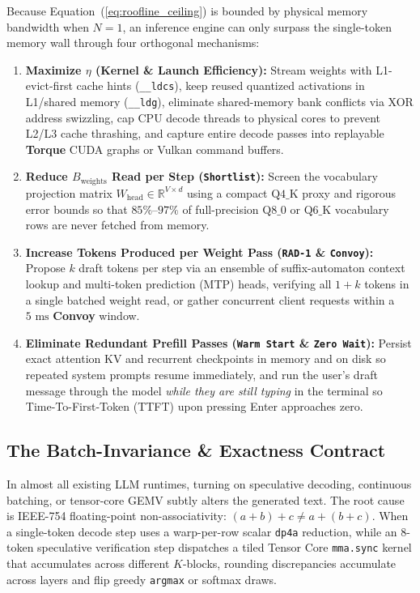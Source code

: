 \documentclass[10pt,a4paper]{article}
\theoremstyle{swzstyle}
\newcommand{\code}[1]{\texttt{#1}}
\begin{document}
Because Equation~(\ref{eq:roofline_ceiling}) is bounded by physical memory bandwidth when $N=1$, an inference engine can only surpass the single-token memory wall through four orthogonal mechanisms:
\begin{enumerate}
  \item \textbf{Maximize $\eta$ (Kernel \& Launch Efficiency):} Stream weights with L1-evict-first cache hints (\code{\_\_ldcs}), keep reused quantized activations in L1/shared memory (\code{\_\_ldg}), eliminate shared-memory bank conflicts via XOR address swizzling, cap CPU decode threads to physical cores to prevent L2/L3 cache thrashing, and capture entire decode passes into replayable \textbf{Torque} CUDA graphs or Vulkan command buffers.
  \item \textbf{Reduce $B_{\text{weights}}$ Read per Step (\texttt{Shortlist}):} Screen the vocabulary projection matrix $W_{\text{head}} \in \mathbb{R}^{V \times d}$ using a compact $\text{Q4\_K}$ proxy and rigorous error bounds so that $85\%\text{--}97\%$ of full-precision $\text{Q8\_0}$ or $\text{Q6\_K}$ vocabulary rows are never fetched from memory.
  \item \textbf{Increase Tokens Produced per Weight Pass (\texttt{RAD-1} \& \texttt{Convoy}):} Propose $k$ draft tokens per step via an ensemble of suffix-automaton context lookup and multi-token prediction (MTP) heads, verifying all $1+k$ tokens in a single batched weight read, or gather concurrent client requests within a $5\text{ ms}$ \textbf{Convoy} window.
  \item \textbf{Eliminate Redundant Prefill Passes (\texttt{Warm Start} \& \texttt{Zero Wait}):} Persist exact attention KV and recurrent checkpoints in memory and on disk so repeated system prompts resume immediately, and run the user's draft message through the model \emph{while they are still typing} in the terminal so Time-To-First-Token (TTFT) upon pressing Enter approaches zero.
\end{enumerate}

\subsection{The Batch-Invariance \& Exactness Contract}

In almost all existing LLM runtimes, turning on speculative decoding, continuous batching, or tensor-core GEMV subtly alters the generated text. The root cause is IEEE-754 floating-point non-associativity: $(a + b) + c \neq a + (b + c)$. When a single-token decode step uses a warp-per-row scalar \code{dp4a} reduction, while an 8-token speculative verification step dispatches a tiled Tensor Core \code{mma.sync} kernel that accumulates across different $K$-blocks, rounding discrepancies accumulate across layers and flip greedy \code{argmax} or softmax draws.
\end{document}
